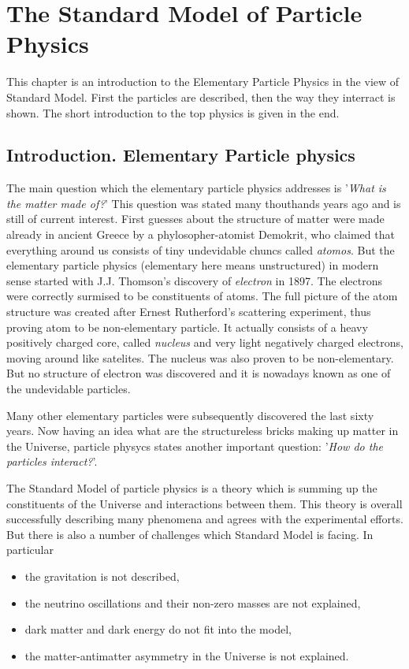 \chapter{The Standard Model of Particle Physics}\label{chapt:SM}

This chapter is an introduction to the Elementary Particle Physics in the view of Standard Model.
First the particles are described, then the way they interract is shown. The short introduction
to the top physics is given in the end.

\section{Introduction. Elementary Particle physics}

The main question which the elementary particle physics addresses is '\textit{What is the matter made of?}'
This question was stated many thouthands years ago and is still of current interest. First guesses about
the structure of matter were made already in ancient Greece by a phylosopher-atomist Demokrit, who
claimed that everything around us consists of tiny undevidable chuncs called \textit{atomos}\cite{yangcn}.
But the elementary particle physics (elementary here means unstructured) in modern sense started with 
J.J. Thomson's discovery of \textit{electron}\cite{jjthome} in 1897. The electrons were correctly surmised to be constituents
of atoms. The full picture of the atom structure was created after Ernest Rutherford's scattering experiment\cite{rutherford},
thus proving atom to be non-elementary particle. It actually consists of a heavy positively charged core, called 
\textit{nucleus} and very light negatively charged electrons, moving around like satelites. 
The nucleus was also proven to be non-elementary. But no structure of electron was discovered 
and it is nowadays known as one of the undevidable particles. 

Many other elementary particles were subsequently discovered the last sixty years. Now having an idea 
what are the structureless bricks making up matter in the Universe, particle physycs
states another important question: '\textit{How do the particles interact?}'.

The Standard Model of particle physics is a theory which is summing up the constituents of the Universe
and interactions between them. This theory is overall successfully describing many phenomena and 
agrees with the experimental efforts. But there is also a number of challenges which Standard Model
is facing. In particular
\begin{itemize}
 \item the gravitation is not described,
 \item the neutrino oscillations and their non-zero masses are not explained,
 \item dark matter and dark energy do not fit into the model,
 \item the matter-antimatter asymmetry in the Universe is not explained.
\end{itemize}


